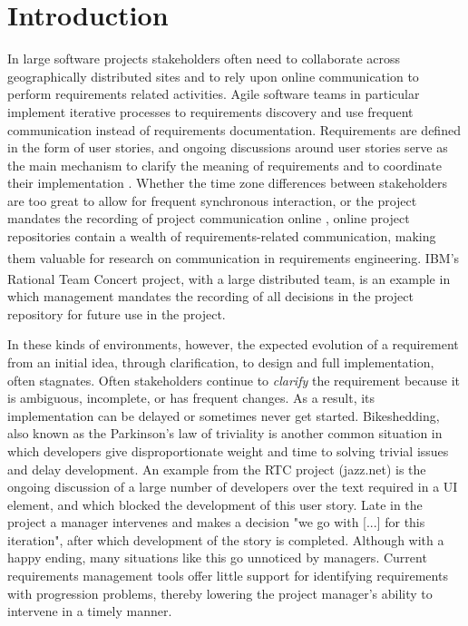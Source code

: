 \section{Introduction}


In large software projects stakeholders often need to collaborate across geographically distributed sites and to rely upon online communication to perform requirements related activities. Agile software teams in particular implement iterative processes to requirements discovery and use frequent communication instead of requirements documentation. 
Requirements are defined in the form of user stories, and ongoing discussions around user stories serve as the main mechanism to clarify the meaning of requirements and to coordinate their implementation \cite{Cao2008}. Whether the time zone differences between stakeholders are too great to allow for frequent synchronous interaction, or the project mandates the recording of project communication online  \cite{Frost2007}, online project repositories contain a wealth of requirements-related communication, making them valuable for research on communication in requirements engineering. 
IBM\textsuperscript{\textregistered}'s Rational Team Concert\textsuperscript{\textregistered} project, with a large distributed team, is an example in which management mandates the recording of all decisions in the project repository for future use in the project\cite{Frost2007}. 

In these kinds of environments, however, the expected evolution of a requirement from an initial idea, through clarification, to design and full implementation, often stagnates. 
Often stakeholders continue to \emph{clarify} the requirement because it is ambiguous, incomplete, or has frequent changes. As a result, its implementation can be delayed or sometimes never get started. Bikeshedding, also known as the Parkinson's law of triviality\cite{Parkinson1958} is another common situation in which developers give disproportionate weight and time to solving trivial issues and delay development. An example from the RTC project (jazz.net) is the ongoing discussion of a large number of developers over the  text required in a UI element, and which blocked the development of this user story. Late in the project a manager intervenes and makes a decision "we go with [...] for this iteration", after which development of the story is completed. Although with a happy ending, many situations like this go unnoticed by managers. Current requirements management tools offer little support for identifying requirements with progression problems, thereby lowering the project manager's  ability to intervene in a timely manner.

